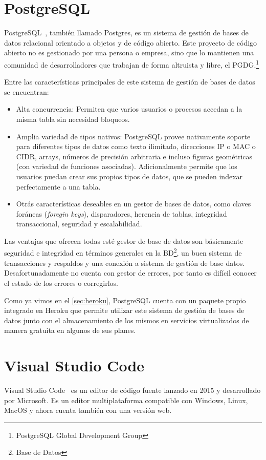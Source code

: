 \documentclass[a4paper, 12pt]{book}
\begin{document}
\section{PostgreSQL}
\label{sec:postgeSQL}
PostgreSQL~\cite{postgresql}, también llamado Postgres, es un sistema de gestión de bases de datos relacional orientado a objetos y de código abierto. Este proyecto de código abierto no es gestionado por una persona o empresa, sino que lo mantienen una comunidad de desarrolladores que trabajan de forma altruista y libre, el PGDG.\footnote{PostgreSQL Global Development Group}

Entre las características principales de este sistema de gestión de bases de datos se encuentran: 
\begin{itemize}
	\item Alta concurrencia: Permiten que varios usuarios o procesos accedan a la misma tabla sin necesidad bloqueos. 
	\item Amplia variedad de tipos nativos: PostgreSQL provee nativamente soporte para diferentes tipos de datos como texto ilimitado, direcciones IP o MAC o CIDR, arrays, números de precisión arbitraria e incluso figuras geométricas (con variedad de funciones asociadas). Adicionalmente permite que los usuarios puedan crear sus propios tipos de datos, que se pueden indexar perfectamente a una tabla. 
	\item Otrás características deseables en un gestor de bases de datos, como claves foráneas (\emph{foregin keys}), disparadores, herencia de tablas, integridad transaccional, seguridad y escalabilidad.  
\end{itemize}
Las ventajas que ofrecen todas esté gestor de base de datos son básicamente seguridad e integridad en términos generales en la BD\footnote{Base de Datos}, un buen sistema de transacciones y respaldos y una conexión a sistema de gestión de base datos. Desafortunadamente no cuenta con gestor de errores, por tanto es difícil conocer el estado de los errores o corregirlos. 

Como ya vimos en el \ref{sec:heroku}, PostgreSQL cuenta con un paquete propio integrado en Heroku que permite utilizar este sistema de gestión de bases de datos junto con el almacenamiento de los mismos en servicios virtualizados de manera gratuita en algunos de sus planes.  

\section{Visual Studio Code}
Visual Studio Code~\cite{vscode} es un editor de código fuente lanzado en 2015 y desarrollado por Microsoft. Es un editor multiplataforma compatible con Windows, Linux, MacOS y ahora cuenta también con una versión web. 
\end{document}
